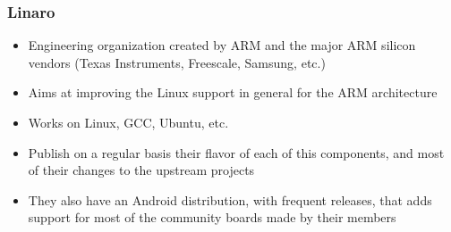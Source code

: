 \begin{frame}
  \frametitle{Linaro}
  \begin{itemize}
  \item Engineering organization created by ARM and the major ARM
    silicon vendors (Texas Instruments, Freescale, Samsung, etc.)
  \item Aims at improving the Linux support in general for the ARM
    architecture
  \item Works on Linux, GCC, Ubuntu, etc.
  \item Publish on a regular basis their flavor of each of this
    components, and most of their changes to the upstream projects
  \item They also have an Android distribution, with frequent
    releases, that adds support for most of the community boards made
    by their members
  \end{itemize}
\end{frame}
